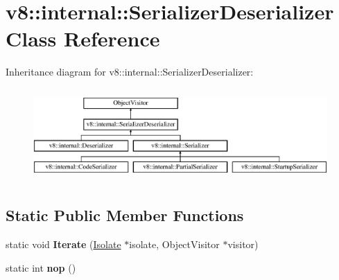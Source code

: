 \hypertarget{classv8_1_1internal_1_1_serializer_deserializer}{}\section{v8\+:\+:internal\+:\+:Serializer\+Deserializer Class Reference}
\label{classv8_1_1internal_1_1_serializer_deserializer}
Inheritance diagram for v8\+:\+:internal\+:\+:Serializer\+Deserializer\+:\begin{figure}[H]
\begin{center}
\leavevmode
\includegraphics[height=3.555556cm]{classv8_1_1internal_1_1_serializer_deserializer}
\end{center}
\end{figure}
\subsection*{Static Public Member Functions}
\begin{DoxyCompactItemize}
\item 
\hypertarget{classv8_1_1internal_1_1_serializer_deserializer_a8c284f6dc5501d03f52a1dc8a2a220d2}{}static void {\bfseries Iterate} (\hyperlink{classv8_1_1internal_1_1_isolate}{Isolate} $\ast$isolate, Object\+Visitor $\ast$visitor)\label{classv8_1_1internal_1_1_serializer_deserializer_a8c284f6dc5501d03f52a1dc8a2a220d2}

\item 
\hypertarget{classv8_1_1internal_1_1_serializer_deserializer_a0276e0873832e14d4455ba7c49f02875}{}static int {\bfseries nop} ()\label{classv8_1_1internal_1_1_serializer_deserializer_a0276e0873832e14d4455ba7c49f02875}

\end{DoxyCompactItemize}
